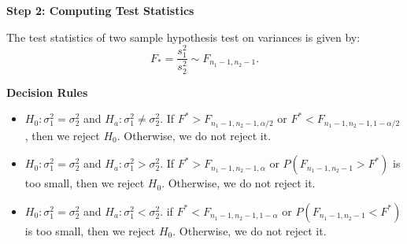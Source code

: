 \textbf{Step 2: Computing Test Statistics}

\begin{definition}
The test statistics of two sample hypothesis test on variances is given by: \[ F_* = \frac{s_1^2}{s_2^2} \sim F_{n_1-1,n_2-1}.\]
\end{definition}

\textbf{Decision Rules}

\begin{itemize}
	\item $H_0: \sigma_1^2 = \sigma_2^2$ and $H_a:\sigma_1^2 \neq \sigma_2^2$. If $F^* > F_{n_1-1,n_2-1,\alpha/2}$ or $F^* < F_{n_1-1,n_2-1,1 - \alpha/2}$, then we reject $H_0$. Otherwise, we do not reject it.
	\item $H_0: \sigma_1^2 = \sigma_2^2$ and $H_a: \sigma_1^2 > \sigma_2^2$. If $F^*> F_{n_1-1,n_2-1,\alpha}$ or $P(F_{n_1-1,n_2-1} > F^*)$ is too small, then we reject $H_0$. Otherwise, we do not reject it.
	\item $H_0: \sigma_1^2 = \sigma_2^2$ and $H_a: \sigma_1^2 < \sigma_2^2$. if $F^* < F_{n_1-1,n_2-1,1-\alpha}$ or $P(F_{n_1-1,n_2-1} < F^*)$ is too small, then we reject $H_0$. Otherwise, we do not reject it.
\end{itemize}


